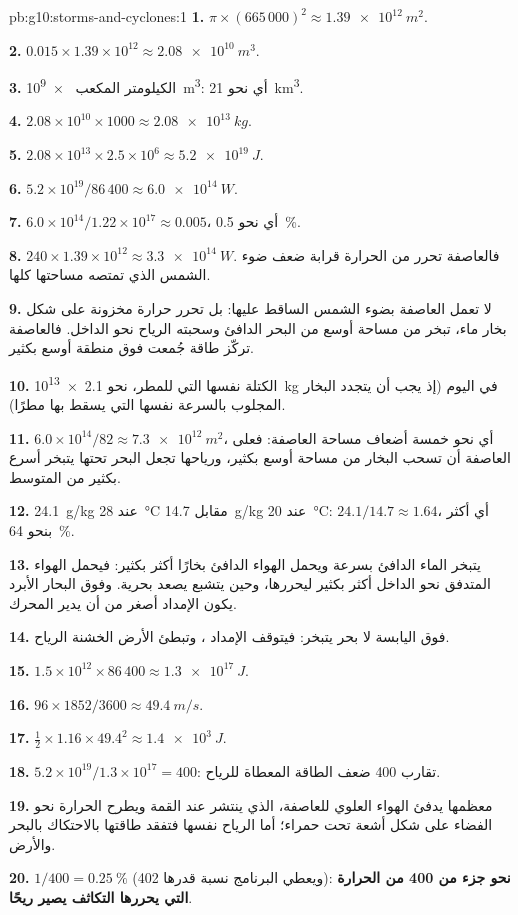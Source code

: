 \begin{solution}{pb:g10:storms-and-cyclones:1}
\textbf{1.} $\pi \times (665\,000)^2 \approx \qty{1.39e12}{m^2}$.

\textbf{2.} $0.015 \times 1.39\times10^{12} \approx \qty{2.08e10}{m^3}$.

\textbf{3.} الكيلومتر المكعب \qty{e9}{m^3}: أي نحو \qty{21}{km^3}.

\textbf{4.} $2.08\times10^{10} \times 1000 \approx \qty{2.08e13}{kg}$.

\textbf{5.} $2.08\times10^{13} \times 2.5\times10^6 \approx \qty{5.2e19}{J}$.

\textbf{6.} $5.2\times10^{19}/86\,400 \approx \qty{6.0e14}{W}$.

\textbf{7.} $6.0\times10^{14}/1.22\times10^{17} \approx 0.005$، أي نحو
\qty{0.5}{\percent}.

\textbf{8.} $240 \times 1.39\times10^{12} \approx \qty{3.3e14}{W}$. فالعاصفة
تحرر من الحرارة قرابة ضعف ضوء الشمس الذي تمتصه مساحتها كلها.

\textbf{9.} لا تعمل العاصفة بضوء الشمس الساقط عليها: بل تحرر حرارة مخزونة على شكل
بخار ماء، تبخر من مساحة أوسع من البحر الدافئ وسحبته الرياح نحو الداخل. فالعاصفة
تركّز طاقة جُمعت فوق منطقة أوسع بكثير.

\textbf{10.} الكتلة نفسها التي للمطر، نحو \qty{2.1e13}{kg} في اليوم (إذ يجب أن
يتجدد البخار المجلوب بالسرعة نفسها التي يسقط بها مطرًا).

\textbf{11.} $6.0\times10^{14}/82 \approx \qty{7.3e12}{m^2}$، أي نحو خمسة أضعاف
مساحة العاصفة: فعلى العاصفة أن تسحب البخار من مساحة أوسع بكثير، ورياحها تجعل البحر
تحتها يتبخر أسرع بكثير من المتوسط.

\textbf{12.} \qty{24.1}{g/kg} عند \qty{28}{\degreeCelsius} مقابل
\qty{14.7}{g/kg} عند \qty{20}{\degreeCelsius}: $24.1/14.7 \approx 1.64$، أي أكثر
بنحو \qty{64}{\percent}.

\textbf{13.} يتبخر الماء الدافئ بسرعة ويحمل الهواء الدافئ بخارًا أكثر بكثير: فيحمل
الهواء المتدفق نحو الداخل  أكثر بكثير ليحررها، وحين يتشبع يصعد بحرية.
وفوق البحار الأبرد يكون الإمداد أصغر من أن يدير المحرك.

\textbf{14.} فوق اليابسة لا بحر يتبخر: فيتوقف الإمداد ، وتبطئ الأرض الخشنة الرياح.

\textbf{15.} $1.5\times10^{12} \times 86\,400 \approx \qty{1.3e17}{J}$.

\textbf{16.} $96 \times 1852/3600 \approx \qty{49.4}{m/s}$.

\textbf{17.} $\frac12 \times 1.16 \times 49.4^2 \approx \qty{1.4e3}{J}$.

\textbf{18.} $5.2\times10^{19}/1.3\times10^{17} = 400$:  تقارب
400 ضعف الطاقة المعطاة للرياح.

\textbf{19.} معظمها يدفئ الهواء العلوي للعاصفة، الذي ينتشر عند القمة ويطرح الحرارة
نحو الفضاء على شكل أشعة تحت حمراء؛ أما الرياح نفسها فتفقد طاقتها بالاحتكاك بالبحر
والأرض.

\textbf{20.} $1/400 = \qty{0.25}{\percent}$ (ويعطي البرنامج نسبة قدرها
402): \textbf{نحو جزء من 400 من الحرارة التي يحررها التكاثف
يصير ريحًا}.
\end{solution}
